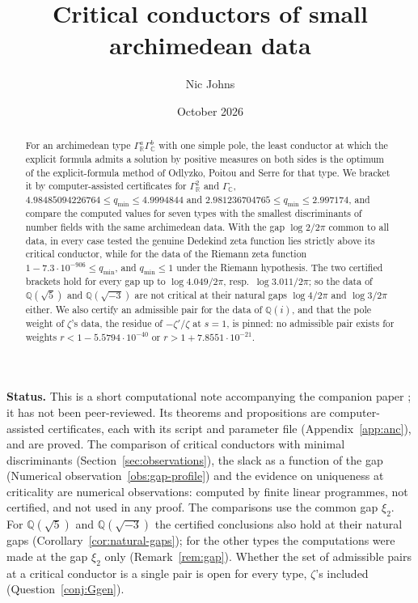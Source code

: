 \documentclass[11pt]{amsart}
\title[Critical conductors]{Critical conductors of small archimedean data}
\author{Nic Johns}
\date{October 2026}
\newcommand{\QQ}{\mathbb Q}
\newcommand{\xin}[1]{\xi_{#1}}
\newcommand{\GR}{\Gamma_{\mathbb R}}
\newcommand{\GC}{\Gamma_{\mathbb C}}
\newcommand{\qmin}{q_{\min}}
\theoremstyle{definition}
\theoremstyle{remark}
\numberwithin{equation}{section}
\begin{document}
\begin{abstract}
For an archimedean type $\GR^a\GC^b$ with one simple pole, the least conductor at which the explicit formula admits a
solution by positive measures on both sides is the optimum of the explicit-formula method of Odlyzko, Poitou and Serre for
that type. We bracket it by computer-assisted certificates for $\GR^2$ and $\GC$, $4.98485094226764\le\qmin\le4.9994844$ and
$2.981236704765\le\qmin\le2.997174$, and compare the computed values for seven types with the smallest discriminants of
number fields with the same archimedean data. With the gap $\log2/2\pi$ common to all data, in every case tested the genuine
Dedekind zeta function lies strictly above its critical conductor, while for the data of the Riemann zeta function
$1-7.3\cdot10^{-906}\le\qmin$, and $\qmin\le1$ under the Riemann hypothesis. The two certified brackets hold for every gap up to
$\log4.049/2\pi$, resp.\ $\log3.011/2\pi$; so the data of $\QQ(\sqrt5)$ and $\QQ(\sqrt{-3})$ are not critical at their natural gaps
$\log4/2\pi$ and $\log3/2\pi$ either. We also certify an
admissible pair for the data of $\QQ(i)$, and that the pole weight of $\zeta$'s data, the residue of $-\zeta'/\zeta$ at $s=1$, is pinned:
no admissible pair exists for weights $r<1-5.5794\cdot10^{-40}$ or $r>1+7.8551\cdot10^{-21}$.
\end{abstract}

\maketitle

\noindent\textbf{Status.} This is a short computational note accompanying the companion paper \cite{PaperI}; it has not been
peer-reviewed. Its theorems and propositions are computer-assisted certificates, each with its script and parameter file
(Appendix~\ref{app:anc}), and are proved. The comparison of critical conductors with minimal discriminants
(Section~\ref{sec:observations}), the slack as a function of the gap (Numerical observation~\ref{obs:gap-profile}) and the evidence on
uniqueness at criticality are numerical observations: computed by finite
linear programmes, not certified, and not used in any proof. The comparisons use the common gap $\xin2$. For $\QQ(\sqrt5)$ and $\QQ(\sqrt{-3})$ the
certified conclusions also hold at their natural gaps (Corollary~\ref{cor:natural-gaps}); for the other types the computations
were made at the gap $\xin2$ only (Remark~\ref{rem:gap}). Whether the set of admissible pairs at a critical conductor is a single pair is open for
every type, $\zeta$'s included (Question~\ref{conj:Ggen}).
\end{document}
